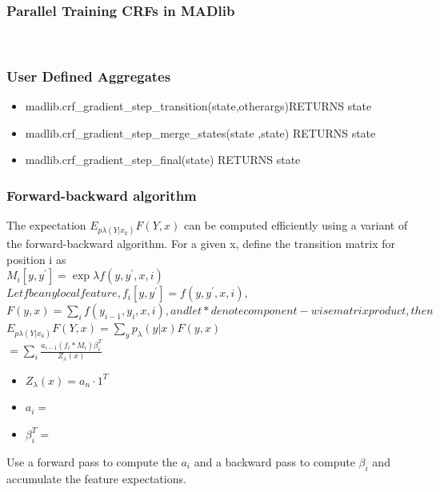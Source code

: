 \documentclass{beamer}
\begin{document}
\begin{frame}
  \frametitle{Parallel Training CRFs in MADlib}
  \\
\end{frame}

\begin{frame}
  \frametitle{User Defined Aggregates}
  \begin{itemize}
\item madlib.crf\_gradient\_step\_transition(state,otherargs)RETURNS state


\item madlib.crf\_gradient\_step\_merge\_states(state ,state) RETURNS state


\item madlib.crf\_gradient\_step\_final(state) RETURNS state
  \end{itemize}
\end{frame}

\begin{frame}
  \frametitle{Forward-backward algorithm}
  The expectation $E_{p\lambda(Y|x_k)}F(Y,x)$ can be computed efficiently using a variant of the forward-backward algorithm.
For a given x, define the transition matrix for position i as \\
$M_i[y,y^\prime]=\exp \lambda f(y,y^\prime,x,i)$\\
$Let f be any local feature, f_i[y,y^\prime]=f(y,y^\prime,x,i),$
$F(y,x)=\sum_i{f(y_{i-1},y_i,x,i)}, and let * denote component-wise matrix product, then$\\
$E_{p\lambda(Y|x_k)}F(Y,x)=\sum_y{p_\lambda(y|x)F(y,x)}$\\
$=\sum_i{\frac{a_{i-1}(f_i*M_i)\beta_i^T}{Z_\lambda(x)}}$\\
\begin{itemize}
\item $Z_\lambda(x)=a_n \cdot 1^T$
\item $a_i=$
\item $\beta_i^T=$
\end{itemize}
Use a forward pass to compute the $a_i$ and a backward pass to compute $\beta_i$ and accumulate the feature expectations.
\end{frame}
\end{document}
